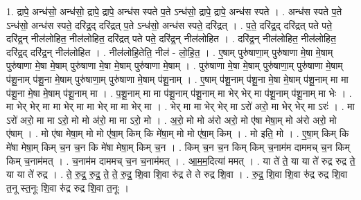 \documentclass[17pt]{extarticle}
\begin{document}
1. द्रापे॒ अन्ध॑सो॒ अन्ध॑सो॒ द्रापे॒ द्रापे॒ अन्ध॑स स्पते प॒ते ऽन्ध॑सो॒ द्रापे॒ द्रापे॒ अन्ध॑स स्पते । . अन्ध॑स स्पते प॒ते ऽन्ध॑सो॒ अन्ध॑स स्पते॒ दरि॑द्र॒द् दरि॑द्रत् प॒ते ऽन्ध॑सो॒ अन्ध॑स स्पते॒ दरि॑द्रत् । . प॒ते॒ दरि॑द्र॒द् दरि॑द्रत् पते पते॒ दरि॑द्र॒न् नील॑लोहित॒ नील॑लोहित॒ दरि॑द्रत् पते पते॒ दरि॑द्र॒न् नील॑लोहित । . दरि॑द्र॒न् नील॑लोहित॒ नील॑लोहित॒ दरि॑द्र॒द् दरि॑द्र॒न् नील॑लोहित । . नील॑लोहि॒तेति॒ नील॑ - लो॒हि॒त॒ । . ए॒षाम् पुरु॑षाणा॒म् पुरु॑षाणा मे॒षा मे॒षाम् पुरु॑षाणा मे॒षा मे॒षाम् पुरु॑षाणा मे॒षा मे॒षाम् पुरु॑षाणा मे॒षाम् । . पुरु॑षाणा मे॒षा मे॒षाम् पुरु॑षाणा॒म् पुरु॑षाणा मे॒षाम् प॑शू॒नाम् प॑शू॒ना मे॒षाम् पुरु॑षाणा॒म् पुरु॑षाणा मे॒षाम् प॑शू॒नाम् । . ए॒षाम् प॑शू॒नाम् प॑शू॒ना मे॒षा मे॒षाम् प॑शू॒नाम् मा मा प॑शू॒ना मे॒षा मे॒षाम् प॑शू॒नाम् मा । . प॒शू॒नाम् मा मा प॑शू॒नाम् प॑शू॒नाम् मा भेर् भेर् मा प॑शू॒नाम् प॑शू॒नाम् मा भेः । . मा भेर् भेर् मा मा भेर् मा मा भेर् मा मा भेर् मा । . भेर् मा मा भेर् भेर् मा ऽरो॑ अरो॒ मा भेर् भेर् मा ऽरः॑ । . मा ऽरो॑ अरो॒ मा मा ऽरो॒ मो मो अ॑रो॒ मा मा ऽरो॒ मो । . अ॒रो॒ मो मो अ॑रो अरो॒ मो ए॑षा मेषा॒म् मो अ॑रो अरो॒ मो ए॑षाम् । . मो ए॑षा मेषा॒म् मो मो ए॑षा॒म् किम् कि मे॑षा॒म् मो मो ए॑षा॒म् किम् । . मो इति॒ मो । . ए॒षा॒म् किम् कि मे॑षा मेषा॒म् किम् च॒न च॒न कि मे॑षा मेषा॒म् किम् च॒न । . किम् च॒न च॒न किम् किम् च॒नाम॑म दाममच् च॒न किम् किम् च॒नाम॑मत् । . च॒नाम॑म दाममच् च॒न च॒नाम॑मत् । . आ॒म॒म॒दित्या॑ ममत् । . या ते॑ ते॒ या या ते॑ रुद्र रुद्र ते॒ या या ते॑ रुद्र । . ते॒ रु॒द्र॒ रु॒द्र॒ ते॒ ते॒ रु॒द्र॒ शि॒वा शि॒वा रु॑द्र ते ते रुद्र शि॒वा । . रु॒द्र॒ शि॒वा शि॒वा रु॑द्र रुद्र शि॒वा त॒नू स्त॒नूः शि॒वा रु॑द्र रुद्र शि॒वा त॒नूः । \newline
\end{document}
